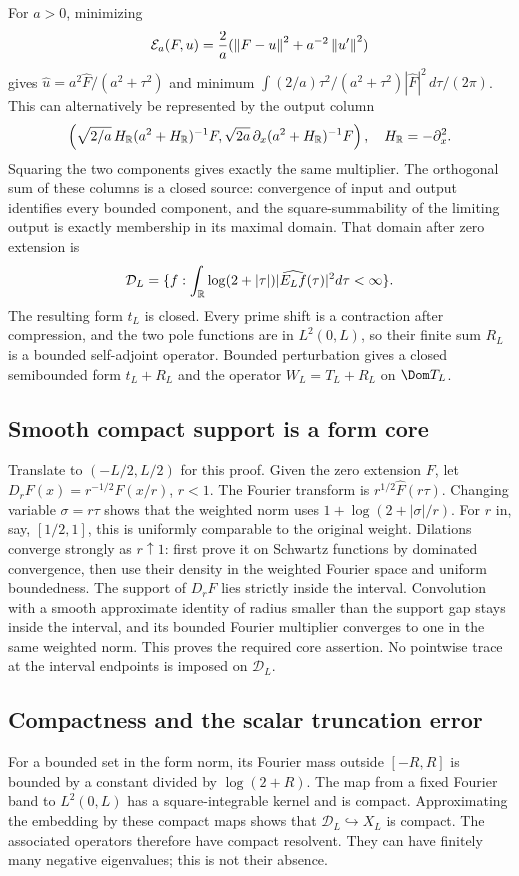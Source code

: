 For $a>0$, minimizing
\[
\mathcal E_a(F,u)=\frac2a(\left\lVert F-u\right\rVert^2+a^{-2}\left\lVert u'\right\rVert^2)
\]
gives $\widehat u=a^2\widehat F/(a^2+\tau^2)$ and minimum
$\int (2/a)\tau^2/(a^2+\tau^2)|\widehat F|^2\,d\tau/(2\pi)$.
This can alternatively be represented by the output column
\[
\left(\sqrt{2/a}\,H_\mathbb R(a^2+H_\mathbb R)^{-1}F,
\sqrt{2a}\,\partial_x(a^2+H_\mathbb R)^{-1}F\right),\quad H_\mathbb R=-\partial_x^2.
\]
Squaring the two components gives exactly the same multiplier. The
orthogonal sum of these columns is a closed source: convergence of input
and output identifies every bounded component, and the square-summability
of the limiting output is exactly membership in its maximal domain.
That domain after zero extension is
\begin{equation}\label{d:domain}
\mathcal D_L=\{f:\int_\mathbb R\log(2+|\tau|)|\widehat{E_Lf}(\tau)|^2d\tau<\infty\}.
\end{equation}
The resulting form $t_L$ is closed. Every prime shift is a contraction
after compression, and the two pole functions are in $L^2(0,L)$, so their
finite sum $R_L$ is a bounded self-adjoint operator. Bounded perturbation
gives a closed semibounded form $t_L+R_L$ and the operator
$W_L=T_L+R_L$ on $\Dom T_L$.

\subsection{Smooth compact support is a form core}
Translate to $(-L/2,L/2)$ for this proof. Given the zero extension $F$,
let $D_rF(x)=r^{-1/2}F(x/r)$, $r<1$. The Fourier transform is
$r^{1/2}\widehat F(r\tau)$. Changing variable $\sigma=r\tau$ shows that
the weighted norm uses $1+\log(2+|\sigma|/r)$. For $r$ in, say,
$[1/2,1]$, this is uniformly comparable to the original weight.
Dilations converge strongly as $r\uparrow1$: first prove it on Schwartz
functions by dominated convergence, then use their density in the weighted
Fourier space and uniform boundedness. The support of $D_rF$ lies strictly
inside the interval. Convolution with a smooth approximate identity of
radius smaller than the support gap stays inside the interval, and its
bounded Fourier multiplier converges to one in the same weighted norm.
This proves the required core assertion. No pointwise trace at the
interval endpoints is imposed on $\mathcal D_L$.

\subsection{Compactness and the scalar truncation error}
For a bounded set in the form norm, its Fourier mass outside $[-R,R]$ is
bounded by a constant divided by $\log(2+R)$. The map from a fixed Fourier
band to $L^2(0,L)$ has a square-integrable kernel and is compact. Approximating
the embedding by these compact maps shows that $\mathcal D_L\hookrightarrow X_L$
is compact. The associated operators therefore have compact resolvent.
They can have finitely many negative eigenvalues; this is not their absence.

